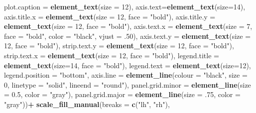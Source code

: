\documentclass[
]{article}
\newenvironment{Shaded}{\begin{snugshade}}{\end{snugshade}}
\newcommand{\DataTypeTok}[1]{\textcolor[rgb]{0.13,0.29,0.53}{#1}}
\newcommand{\DecValTok}[1]{\textcolor[rgb]{0.00,0.00,0.81}{#1}}
\newcommand{\FloatTok}[1]{\textcolor[rgb]{0.00,0.00,0.81}{#1}}
\newcommand{\KeywordTok}[1]{\textcolor[rgb]{0.13,0.29,0.53}{\textbf{#1}}}
\newcommand{\NormalTok}[1]{#1}
\newcommand{\OperatorTok}[1]{\textcolor[rgb]{0.81,0.36,0.00}{\textbf{#1}}}
\newcommand{\StringTok}[1]{\textcolor[rgb]{0.31,0.60,0.02}{#1}}
\begin{document}
\begin{Shaded}
\begin{Highlighting}[]
{{        \DataTypeTok{plot.caption =} \KeywordTok{element_text}\NormalTok{(}\DataTypeTok{size =} \DecValTok{12}\NormalTok{),}
        \DataTypeTok{axis.text=}\KeywordTok{element_text}\NormalTok{(}\DataTypeTok{size=}\DecValTok{14}\NormalTok{),}
        \DataTypeTok{axis.title.x =} \KeywordTok{element_text}\NormalTok{(}\DataTypeTok{size =} \DecValTok{12}\NormalTok{, }\DataTypeTok{face =} \StringTok{"bold"}\NormalTok{),}
        \DataTypeTok{axis.title.y =} \KeywordTok{element_text}\NormalTok{(}\DataTypeTok{size =} \DecValTok{12}\NormalTok{, }\DataTypeTok{face =} \StringTok{"bold"}\NormalTok{),}
        \DataTypeTok{axis.text.x =} \KeywordTok{element_text}\NormalTok{(}\DataTypeTok{size =} \DecValTok{7}\NormalTok{, }\DataTypeTok{face =} \StringTok{"bold"}\NormalTok{, }\DataTypeTok{color =} \StringTok{"black"}\NormalTok{, }\DataTypeTok{vjust =} \FloatTok{.50}\NormalTok{),}
        \DataTypeTok{axis.text.y =} \KeywordTok{element_text}\NormalTok{(}\DataTypeTok{size =} \DecValTok{12}\NormalTok{, }\DataTypeTok{face =} \StringTok{"bold"}\NormalTok{),}
        \DataTypeTok{strip.text.y =} \KeywordTok{element_text}\NormalTok{(}\DataTypeTok{size =} \DecValTok{12}\NormalTok{, }\DataTypeTok{face =} \StringTok{"bold"}\NormalTok{),}
        \DataTypeTok{strip.text.x =} \KeywordTok{element_text}\NormalTok{(}\DataTypeTok{size =} \DecValTok{12}\NormalTok{, }\DataTypeTok{face =} \StringTok{"bold"}\NormalTok{),}
        \DataTypeTok{legend.title =} \KeywordTok{element_text}\NormalTok{(}\DataTypeTok{size=}\DecValTok{14}\NormalTok{, }\DataTypeTok{face =} \StringTok{"bold"}\NormalTok{), }
        \DataTypeTok{legend.text =} \KeywordTok{element_text}\NormalTok{(}\DataTypeTok{size=}\DecValTok{12}\NormalTok{),}
        \DataTypeTok{legend.position =} \StringTok{"bottom"}\NormalTok{,}
        \DataTypeTok{axis.line =} \KeywordTok{element_line}\NormalTok{(}\DataTypeTok{colour =} \StringTok{"black"}\NormalTok{, }
                                 \DataTypeTok{size =} \DecValTok{0}\NormalTok{, }\DataTypeTok{linetype =} \StringTok{"solid"}\NormalTok{, }\DataTypeTok{lineend =} \StringTok{"round"}\NormalTok{),}
        \DataTypeTok{panel.grid.minor =} \KeywordTok{element_line}\NormalTok{(}\DataTypeTok{size =} \FloatTok{0.5}\NormalTok{, }\DataTypeTok{color =} \StringTok{"gray"}\NormalTok{), }
        \DataTypeTok{panel.grid.major =} \KeywordTok{element_line}\NormalTok{(}\DataTypeTok{size =} \FloatTok{.75}\NormalTok{, }\DataTypeTok{color =} \StringTok{"gray"}\NormalTok{))}\OperatorTok{+}
\StringTok{  }\KeywordTok{scale_fill_manual}\NormalTok{(}\DataTypeTok{breaks =} \KeywordTok{c}\NormalTok{(}\StringTok{"lh"}\NormalTok{, }\StringTok{"rh"}\NormalTok{), }
}}
\end{Highlighting}
\end{Shaded}
\end{document}
